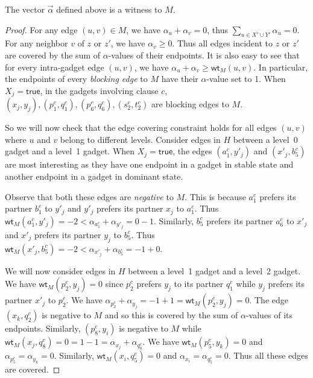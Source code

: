 \documentclass{llncs}
\newcommand{\wt}{\mathsf{wt}}
\begin{document}
 \begin{claim}
   The vector $\vec{\alpha}$ defined above is a witness to $M$.
 \end{claim}
 \begin{proof}
  For any edge $(u,v) \in M$, we have $\alpha_u + \alpha_v = 0$, thus $\sum_{u \in X'\cup Y'}\alpha_u = 0$. For any neighbor $v$ of $z$ or $z'$, we have
  $\alpha_v \ge 0$. Thus all edges incident to $z$ or $z'$ are covered by the sum of $\alpha$-values of their endpoints.
  It is also easy to see that for every intra-gadget edge $(u,v)$, we have $\alpha_u + \alpha_v \ge \wt_M(u,v)$. In particular, the endpoints of
  every {\em blocking edge} to $M$ have their $\alpha$-value set to 1. When $X_j = \mathsf{true}$, in the gadgets involving clause $c$,
  $(x_j,y_j),(p^c_1,q^c_1),(p^c_6,q^c_6),(s^c_2,t^c_2)$ are blocking edges to $M$.

  \smallskip
  
  So we will now check that the edge covering constraint holds for all edges $(u,v)$  where $u$ and $v$ belong to different levels. Consider edges in $H$ between a
  level~0 gadget and
  a level~1 gadget. When $X_j = \mathsf{true}$, the edges $(a^c_1,y'_j)$ and $(x'_j,b^c_5)$ are most interesting as they have one endpoint in a gadget in stable state
  and another endpoint in a gadget in dominant state.
  
  Observe that both these edges are {\em negative} to $M$. This is because $a^c_1$ prefers its partner $b^c_1$
  to $y'_j$ and $y'_j$ prefers its partner $x_j$ to $a^c_1$. Thus $\wt_M(a^c_1,y'_j) = -2 < \alpha_{a^c_1} + \alpha_{y'_j}  = 0 - 1$.
  Similarly, $b^c_5$ prefers its partner $a^c_6$ to $x'_j$ and $x'_j$ prefers its partner $y_j$ to $b^c_5$.
   Thus  $\wt_M(x'_j,b^c_5) = -2 < \alpha_{x'_j}  + \alpha_{b^c_5} = - 1 + 0$.

   \smallskip

   We will now consider edges in $H$ between a level~1 gadget and a level~2 gadget. %
   We have $\wt_M(p^c_2,y_j) = 0$ since $p^c_2$ prefers $y_j$ to its partner $q^c_1$ while  $y_j$ prefers its partner $x'_j$ to $p^c_2$. We have
   $\alpha_{p^c_2} + \alpha_{y_j} = -1 + 1 = \wt_M(p^c_2,y_j) = 0$. The edge $(x_k,q^c_2)$ is negative to $M$ and so this is 
   covered by the sum of $\alpha$-values of its endpoints.
   Similarly, $(p^c_8,y_i)$ is negative to $M$ while $\wt_M(x_j,q^c_8) = 0 = 1 - 1 = \alpha_{x_j} + \alpha_{q^c_8}$.
   We have $\wt_M(p^c_5,y_k) = 0$ and $\alpha_{p^c_5} = \alpha_{y_k} = 0$. Similarly, 
   $\wt_M(x_i,q^c_5) = 0$ and $\alpha_{x_i} = \alpha_{q^c_5} =  0$. Thus all these edges are covered.


\end{proof}
\end{document}
